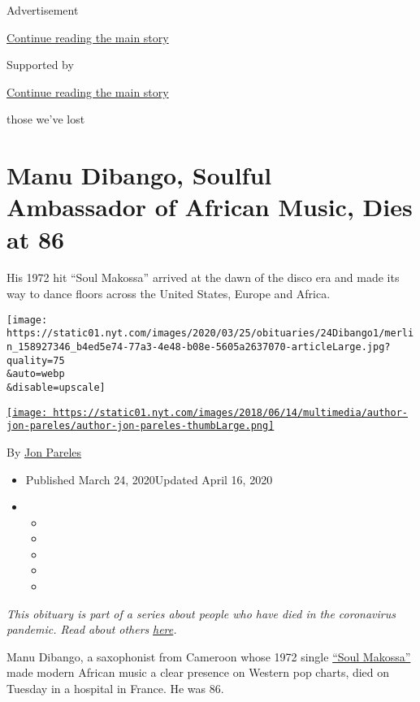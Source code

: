 Advertisement

\protect\hyperlink{after-top}{Continue reading the main story}

Supported by

\protect\hyperlink{after-sponsor}{Continue reading the main story}

those we've lost

\hypertarget{manu-dibango-soulful-ambassador-of-african-music-dies-at-86}{%
\section{Manu Dibango, Soulful Ambassador of African Music, Dies at
86}\label{manu-dibango-soulful-ambassador-of-african-music-dies-at-86}}

His 1972 hit ``Soul Makossa'' arrived at the dawn of the disco era and
made its way to dance floors across the United States, Europe and
Africa.

\texttt{[image: https://static01.nyt.com/images/2020/03/25/obituaries/24Dibango1/merlin\_158927346\_b4ed5e74-77a3-4e48-b08e-5605a2637070-articleLarge.jpg?quality=75\\\&auto=webp\\\&disable=upscale]}

\href{https://www.nytimes.com/by/jon-pareles}{\texttt{[image: https://static01.nyt.com/images/2018/06/14/multimedia/author-jon-pareles/author-jon-pareles-thumbLarge.png]}}

By \href{https://www.nytimes.com/by/jon-pareles}{Jon Pareles}

\begin{itemize}
\item
  Published March 24, 2020Updated April 16, 2020
\item
  \begin{itemize}
  \item
  \item
  \item
  \item
  \item
  \end{itemize}
\end{itemize}

\emph{This obituary is part of a series about people who have died in
the coronavirus pandemic. Read about others}
\href{https://www.nytimes.com/series/people-who-have-died-of-the-coronavirus}{\emph{here}}\emph{.}

Manu Dibango, a saxophonist from Cameroon whose 1972 single
\href{https://www.youtube.com/watch?v=EF92yOsv3Y8}{``Soul Makossa''}
made modern African music a clear presence on Western pop charts, died
on Tuesday in a hospital in France. He was 86.

